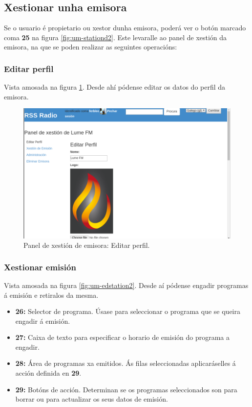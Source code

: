 \subsection{Xestionar unha emisora}

Se o usuario é propietario ou xestor dunha emisora, poderá ver o botón marcado coma \textbf{25} na figura \ref{fig:um-stationd2}. Este levaralle ao panel de xestión da emisora, na que se poden realizar as seguintes operacións:

\subsubsection{Editar perfil}

Vista amosada na figura \ref{fig:um-edstation1}. Desde ahí pódense editar os datos do perfil da emisora.

\begin{figure}[h]
	\centering
	\includegraphics[scale=0.43,keepaspectratio=true]{./images/usermanual/um-edstation1.png}
	\caption{Panel de xestión de emisora: Editar perfil.}
	\label{fig:um-edstation1}
\end{figure}

\subsubsection{Xestionar emisión}

Vista amosada na figura \ref{fig:um-edstation2}. Desde aí pódense engadir programas á emisión e retiralos da mesma.

\begin{itemize}
	\item \textbf{26:} Selector de programa. Úsase para seleccionar o programa que se queira engadir á emisión.
	\item \textbf{27:} Caixa de texto para especificar o horario de emisión do programa a engadir.
	\item \textbf{28:} Área de programas xa emitidos. Ás filas seleccionadas aplicaráselles á acción definida en \textbf{29}.
	\item \textbf{29:} Botóns de acción. Determinan se os programas seleccionados son para borrar ou para actualizar os seus datos de emisión.
\end{itemize}

